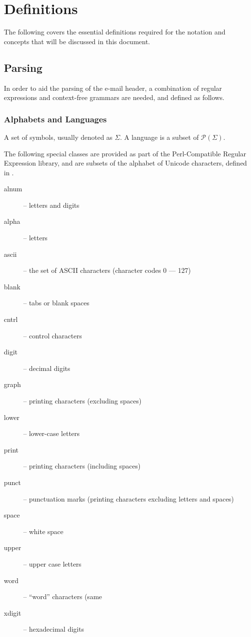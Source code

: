 \chapter{Definitions}\label{chap:def}
The following covers the essential definitions required for the notation and concepts that will be discussed in this document.
\section{Parsing}
In order to aid the parsing of the e-mail header, a combination of regular expressions and context-free grammars are needed, and defined as follows.
\subsection{Alphabets and Languages}

A set of symbols, usually denoted as $\Sigma$.  A language is a subset of $\mathcal P (\Sigma)$.

The following special classes are provided as part of the Perl-Compatible Regular Expression library, and are subsets of the alphabet of Unicode characters, defined in \cite{php_group_gutmans_lerdorf_suraski_boerger}.
\begin{description}
\item[alnum] -- letters and digits
\item[alpha] -- letters
\item[ascii] -- the set of ASCII characters (character codes 0 --- 127)
\item[blank] -- tabs or blank spaces
\item[cntrl] -- control characters
\item[digit] -- decimal digits
\item[graph] -- printing characters (excluding spaces)
\item[lower] -- lower-case letters
\item[print] -- printing characters (including spaces)
\item[punct] -- punctuation marks (printing characters excluding letters and spaces)
\item[space] -- white space
\item[upper] -- upper case letters
\item[word] -- ``word'' characters (same 
\item[xdigit] -- hexadecimal digits
\end{description}
